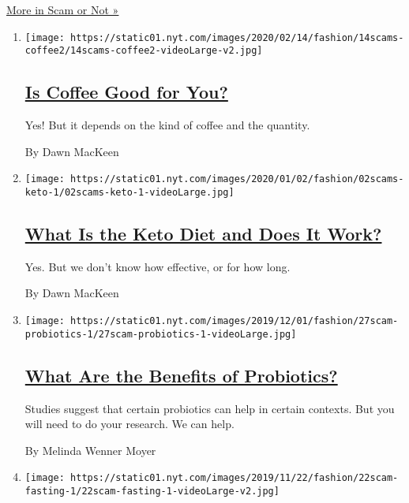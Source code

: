 \href{/column/scam-or-not}{More in Scam or Not »}

\begin{enumerate}
\def\labelenumi{\arabic{enumi}.}
\item
  \texttt{[image: https://static01.nyt.com/images/2020/02/14/fashion/14scams-coffee2/14scams-coffee2-videoLarge-v2.jpg]}

  \hypertarget{is-coffee-good-for-you}{%
  \subsection{\texorpdfstring{\href{/2020/02/13/style/self-care/coffee-benefits.html}{Is
  Coffee Good for
  You?}}{Is Coffee Good for You?}}\label{is-coffee-good-for-you}}

  Yes! But it depends on the kind of coffee and the quantity.

  By Dawn MacKeen
\item
  \texttt{[image: https://static01.nyt.com/images/2020/01/02/fashion/02scams-keto-1/02scams-keto-1-videoLarge.jpg]}

  \hypertarget{what-is-the-keto-diet-and-does-it-work}{%
  \subsection{\texorpdfstring{\href{/2020/01/02/style/self-care/keto-diet-explained-benefits.html}{What
  Is the Keto Diet and Does It
  Work?}}{What Is the Keto Diet and Does It Work?}}\label{what-is-the-keto-diet-and-does-it-work}}

  Yes. But we don't know how effective, or for how long.

  By Dawn MacKeen
\item
  \texttt{[image: https://static01.nyt.com/images/2019/12/01/fashion/27scam-probiotics-1/27scam-probiotics-1-videoLarge.jpg]}

  \hypertarget{what-are-the-benefits-of-probiotics}{%
  \subsection{\texorpdfstring{\href{/2019/11/27/style/self-care/probiotics-benefits.html}{What
  Are the Benefits of
  Probiotics?}}{What Are the Benefits of Probiotics?}}\label{what-are-the-benefits-of-probiotics}}

  Studies suggest that certain probiotics can help in certain contexts.
  But you will need to do your research. We can help.

  By Melinda Wenner Moyer
\item
  \texttt{[image: https://static01.nyt.com/images/2019/11/22/fashion/22scam-fasting-1/22scam-fasting-1-videoLarge-v2.jpg]}


\end{enumerate}
